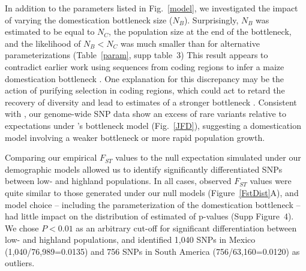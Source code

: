 In addition to the parameters listed in Fig.~\ref{model}, we investigated the impact of varying the domestication bottleneck size ($N_B$).  
Surprisingly, $N_B$ was estimated to be equal to $N_C$, the population size at the end of the bottleneck, and the likelihood of $N_B<N_C$ was much smaller than for alternative parameterizations (Table~\ref{param}, supp table~3) 
This result appears to contradict earlier work using sequences from coding regions to infer a maize domestication bottleneck \citep{Wright_2005_15919994, Tenaillon2004}.  One explanation for this discrepancy may be the action of purifying selection in coding regions, which could act to retard the recovery of diversity and lead to estimates of a stronger bottleneck \citep{Hufford_2012_22660546}.  Consistent with \citet{Hufford_2012_22660546}, our genome-wide SNP data show an excess of rare variants relative to expectations under \citet{Wright_2005_15919994}'s bottleneck model (Fig.~\ref{JFD}), suggesting a domestication model involving a weaker bottleneck or more rapid population growth.

Comparing our empirical $F_{ST}$ values to the null expectation simulated under our demographic models allowed us to identify significantly differentiated SNPs between low- and highland populations. In all cases, observed $F_{ST}$ values were quite similar to those generated under our null models  (Figure~\ref{FstDist}A), and model choice -- including the parameterization of the domestication bottleneck -- had little impact on the distribution of estimated of p-values (Supp Figure~4). We chose $P<0.01$ as an arbitrary cut-off for significant differentiation between low- and highland populations, and identified 1,040 SNPs in Mexico (1,040/76,989=0.0135) and 756 SNPs in South America (756/63,160=0.0120) as outliers.  

